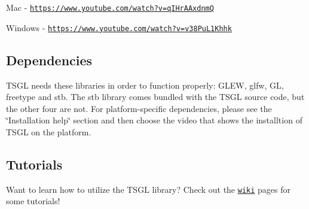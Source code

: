 Mac -\/ \href{https://www.youtube.com/watch?v=qIHrAAxdnmQ}{\tt https\+://www.\+youtube.\+com/watch?v=q\+I\+Hr\+A\+Axdnm\+Q}

Windows -\/ \href{https://www.youtube.com/watch?v=v38PuL1Khhk}{\tt https\+://www.\+youtube.\+com/watch?v=v38\+Pu\+L1\+Khhk} 

 \subsection*{Dependencies }

T\+S\+G\+L needs these libraries in order to function properly\+: G\+L\+E\+W, glfw, G\+L, freetype and stb. The stb library comes bundled with the T\+S\+G\+L source code, but the other four are not. For platform-\/specific dependencies, please see the \char`\"{}\+Installation help\char`\"{} section and then choose the video that shows the installtion of T\+S\+G\+L on the platform. 

 \subsection*{Tutorials }

Want to learn how to utilize the T\+S\+G\+L library? Check out the \href{https://github.com/Calvin-CS/TSGL/wiki}{\tt wiki} pages for some tutorials! 
